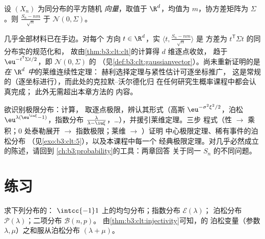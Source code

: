 \begin{theorem}[多维中心极限定理]
\label{thm:b3:clt:multiclt}
设 $(X_n)$ 为同分布的平方随机
\emph{向量}，取值于 $\R^d$，均值为 $m$，协方差矩阵为
$\Sigma$。则 $\frac{S_n - nm}{\sqrt n}$ 于
 $\mathcal N(0,
\Sigma)$。
\admitted
\end{theorem}

\begin{remark}\label{rem:b3:clt:multiclt}
几乎全部材料已在手边。对每个
方向 $t \in \R^d$，实 $\langle t,
\frac{S_n - nm}{\sqrt n}\rangle$ 是
方差为 $t^{\mathsf T}\Sigma t$ 的同分布实的规范化和，
故由\cref{thm:b3:clt:clt}的计算得
$d$ 维逐点收敛，
趋于 $\eu^{-t^{\mathsf T}\Sigma t/2}$，即
$\mathcal N(0, \Sigma)$ 的
（见\cref{def:b3:clt:gaussianvector}）。尚未重新证明的是
\emph{在 $\R^d$ 中}的莱维连续性定理：
赫利选择定理与紧性估计可逐坐标推广，
这是常规的（逐坐标进行），而此处的克拉默–沃尔德化归
在任何研究生概率课程中都会认真完成；
此外无需超出本章方法的
内容。
\end{remark}

\begin{method}\label{met:b3:clt:method}
欲识别极限分布：计算，
取逐点极限，辨认其形式（高斯
$\eu^{-\sigma^2\xi^2/2}$，泊松
$\eu^{\lambda(\eu^{\iu\xi}-1)}$，指数分布 $\frac{\lambda}
{\lambda - \iu\xi}$，\dots），并援引莱维定理。三步
程式（性 $\to$ 乘积；$0$ 处泰勒展开 $\to$
指数极限；莱维 $\to$ ）证明
中心极限定理、稀有事件的泊松分布
（见\cref{exo:b3:clt:5}），以及本课程中每一个
经典极限定理。对几乎必然成立的陈述，请回到
\cref{ch:b3:probability}的工具：两章回答
关于同一 $S_n$ 的不同问题。
\end{method}

\section{练习}

\begin{exercise}[$\star$]\label{exo:b3:clt:1}
求下列分布的：
$\intcc{-1}1$ 上的均匀分布；指数分布 $\mathcal E(\lambda)$；
泊松分布 $\mathcal P(\lambda)$；二项分布 $\mathcal B(n, p)$。
由\cref{thm:b3:clt:injectivity}可知，的
泊松变量（参数 $\lambda, \mu$）之和服从泊松分布 $(\lambda +
\mu)$。
\end{exercise}

